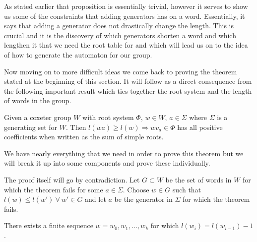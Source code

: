 \documentclass[a4paper,12pt]{article}
\begin{document}
As stated earlier that proposition is essentially trivial, however it serves to show us some of the constraints that adding generators has on a word. Essentially, it says that adding a generator does not drastically change the length. This is crucial and it is the discovery of which generators shorten a word and which lengthen it that we need the root table for and which will lead us on to the idea of how to generate the automaton for our group.

Now moving on to more difficult ideas we come back to proving the theorem stated at the beginning of this section. It will follow as a direct consequence from the following important result which ties together the root system and the length of words in the group.

\begin{thm}
\label{relate_length_roots}
	Given a coxeter group $W$ with root system $\Phi$, $w \in W$, $a \in \Sigma$ where $\Sigma$ is a generating set for $W$. Then $l(wa) \geq l(w) \Rightarrow wv_a \in \Phi$ has all positive coefficients when written as the sum of simple roots.
\end{thm}

We have nearly everything that we need in order to prove this theorem but we will break it up into some components and prove these individually.

The proof itself will go by contradiction. Let $G \subset W$ be the set of words in $W$ for which the theorem fails for some $a \in \Sigma$. Choose $w \in G$ such that $l(w) \leq l(w') \: \forall \: w' \in G$ and let $a$ be the generator in $\Sigma$ for which the theorem fails.

\begin{lem}
\label{finite_sequence_ws}
	There exists a finite sequence $w = w_0, w_1, \ldots, w_k$ for which $l(w_i) = l(w_{i-1}) - 1$.
\end{lem}
\end{document}
